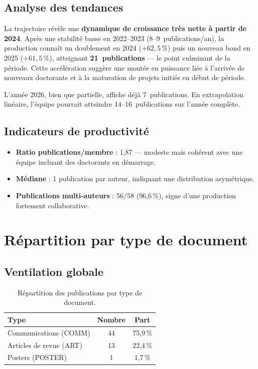 \documentclass[a4paper,11pt]{article}
\begin{document}
\subsection{Analyse des tendances}

La trajectoire révèle une \textbf{dynamique de croissance très nette à partir de 2024}. Après une stabilité basse en 2022--2023 (8--9~publications/an), la production connaît un doublement en 2024 ($+62{,}5\,\%$) puis un nouveau bond en 2025 ($+61{,}5\,\%$), atteignant \textbf{21~publications} --- le point culminant de la période. Cette accélération suggère une montée en puissance liée à l'arrivée de nouveaux doctorants et à la maturation de projets initiés en début de période.

L'année 2026, bien que partielle, affiche déjà 7~publications. En extrapolation linéaire, l'équipe pourrait atteindre 14--16~publications sur l'année complète.

\subsection{Indicateurs de productivité}

\begin{itemize}[nosep]
  \item \textbf{Ratio publications/membre} : 1,87 --- modeste mais cohérent avec une équipe incluant des doctorants en démarrage.
  \item \textbf{Médiane} : 1 publication par auteur, indiquant une distribution asymétrique.
  \item \textbf{Publications multi-auteurs} : 56/58 (96,6\,\%), signe d'une production fortement collaborative.
\end{itemize}

\section{Répartition par type de document}

\subsection{Ventilation globale}

\begin{table}[h!]
\centering
\begin{tabular}{lcc}
\toprule
\textbf{Type} & \textbf{Nombre} & \textbf{Part} \\
\midrule
Communications (COMM) & 44 & 75,9\,\% \\
Articles de revue (ART) & 13 & 22,4\,\% \\
Posters (POSTER) & 1 & 1,7\,\% \\
\bottomrule
\end{tabular}
\caption{Répartition des publications par type de document.}
\end{table}
\end{document}
